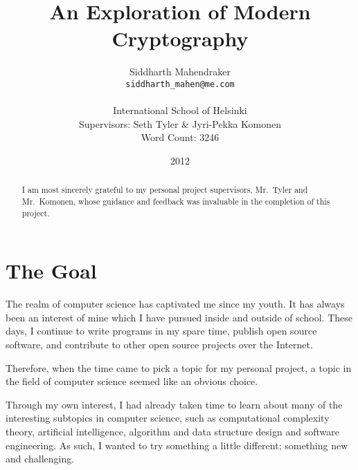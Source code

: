 \documentclass[12pt, a4paper, draft]{report}
\begin{document}
\renewcommand*\thesection{\arabic{section}}
\renewcommand{\cftsecfont}{\bfseries}
\setlength\cftbeforesecskip{5pt}

\title{An Exploration of Modern Cryptography}
\author{Siddharth Mahendraker\\
    \texttt{siddharth\_mahen@me.com}\\\\
    International School of Helsinki\\
    Supervisors: Seth Tyler \& Jyri-Pekka Komonen\\
    Word Count: 3246}
\date{2012}
\maketitle

\renewcommand{\abstractname}{Acknowledgements}
\begin{abstract}
I am most sincerely grateful to my personal project
supervisors, Mr.\ Tyler and Mr.\ Komonen, whose guidance
and feedback was invaluable in the completion of this
project.
\end{abstract}

\setcounter{page}{1}
\tableofcontents
\clearpage

\section*{The Goal}
\setcounter{page}{1}


The realm of computer science has captivated me since my youth. It has
always been an interest of mine which I have pursued inside and outside
of school. These days, I continue to write programs in my spare time,
publish open source software, and contribute to other open source
projects over the Internet.

Therefore, when the time came to pick a topic for my personal project,
a topic in the field of computer science seemed like an obvious choice.

Through my own interest, I had already taken time to learn about many
of the interesting subtopics in computer science, such as computational
complexity theory, artificial intelligence, algorithm and data structure
design and software engineering. As such, I wanted to try something
a little different; something new and challenging.
\end{document}
